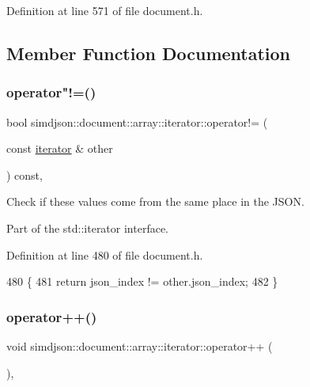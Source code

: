 Definition at line 571 of file document.\+h.



\subsection{Member Function Documentation}
\mbox{\label{classsimdjson_1_1document_1_1array_1_1iterator_a5cac863b65e9fc607d5ed7e5e2a2f35d}} 
\subsubsection{\texorpdfstring{operator"!=()}{operator!=()}}
{\footnotesize\ttfamily bool simdjson\+::document\+::array\+::iterator\+::operator!= (\begin{DoxyParamCaption}\item[{const \hyperlink{classsimdjson_1_1document_1_1array_1_1iterator}{iterator} \&}]{other }\end{DoxyParamCaption}) const\hspace{0.3cm}{\ttfamily [inline]}, {\ttfamily [noexcept]}}



Check if these values come from the same place in the J\+S\+ON. 

Part of the std\+::iterator interface. 

Definition at line 480 of file document.\+h.


\begin{DoxyCode}
480                                                                                                \{
481   \textcolor{keywordflow}{return} json\_index != other.json\_index;
482 \}
\end{DoxyCode}
\mbox{\label{classsimdjson_1_1document_1_1array_1_1iterator_aa8458eb6195491a692a9fae5ca2508df}} 
\subsubsection{\texorpdfstring{operator++()}{operator++()}}
{\footnotesize\ttfamily void simdjson\+::document\+::array\+::iterator\+::operator++ (\begin{DoxyParamCaption}{ }\end{DoxyParamCaption})\hspace{0.3cm}{\ttfamily [inline]}, {\ttfamily [noexcept]}}



